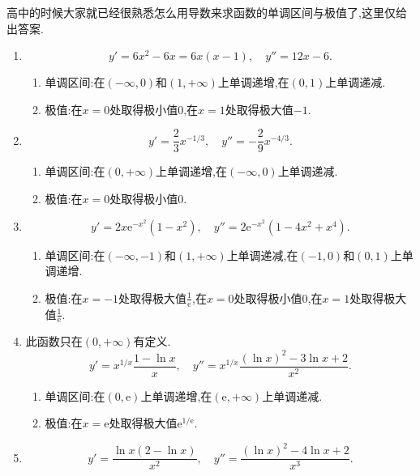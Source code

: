 \begin{solution}
    高中的时候大家就已经很熟悉怎么用导数来求函数的单调区间与极值了,这里仅给出答案.
    \begin{enumerate}
        \item $$y' = 6x^2 - 6x = 6x(x-1), \quad y'' = 12x - 6.$$
              \begin{enumerate}
                  \item[] 单调区间:在$(-\infty,0)$和$(1,+\infty)$上单调递增,在$(0,1)$上单调递减.
                  \item[] 极值:在$x = 0$处取得极小值$0$,在$x = 1$处取得极大值$-1$.
              \end{enumerate}
        \item $$y' = \frac{2}{3}x^{-1/3}, \quad y'' = -\frac{2}{9}x^{-4/3}.$$
              \begin{enumerate}
                  \item[] 单调区间:在$(0,+\infty)$上单调递增,在$(-\infty,0)$上单调递减.
                  \item[] 极值:在$x = 0$处取得极小值$0$.
              \end{enumerate}
        \item $$y' = 2x\mathrm{e}^{-x^2}(1-x^2), \quad y'' = 2\mathrm{e}^{-x^2}(1 - 4x^2 + x^4).$$
              \begin{enumerate}
                  \item[] 单调区间:在$(-\infty,-1)$和$(1,+\infty)$上单调递减,在$(-1,0)$和$(0,1)$上单调递增.
                  \item[] 极值:在$x = -1$处取得极大值$\frac{1}{\mathrm{e}}$,在$x = 0$处取得极小值$0$,在$x = 1$处取得极大值$\frac{1}{\mathrm{e}}$.
              \end{enumerate}
        \item 此函数只在$(0,+\infty)$有定义.
              $$y' = x^{1/x} \frac{1 - \ln x}{x}, \quad y'' = x^{1/x} \frac{(\ln x)^2 - 3\ln x + 2}{x^2}.$$
              \begin{enumerate}
                  \item[] 单调区间:在$(0,\mathrm{e})$上单调递增,在$(\mathrm{e},+\infty)$上单调递减.
                  \item[] 极值:在$x = \mathrm{e}$处取得极大值$\mathrm{e}^{1/\mathrm{e}}$.
              \end{enumerate}
        \item $$y' = \frac{\ln x (2 - \ln x)}{x^2}, \quad y'' = \frac{(\ln x)^2 - 4\ln x + 2}{x^3}.$$
              \begin{enumerate}

\end{enumerate}
\end{enumerate}
\end{solution}

